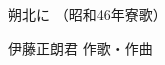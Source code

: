 \documentclass[10pt,b5j]{tarticle} %
\begin{document}
\begin{minipage}[c]{0.7\hsize} %
    \begin{center}
        {\LARGE
            朔北に %
        }
        {\small 
            （昭和46年寮歌） %
        }
    \end{center}
\end{minipage}
\begin{minipage}[c]{0.3\hsize} %
    \begin{flushright} %
        伊藤正朗君 作歌・作曲 %
    \end{flushright}
\end{minipage}
\end{document}
